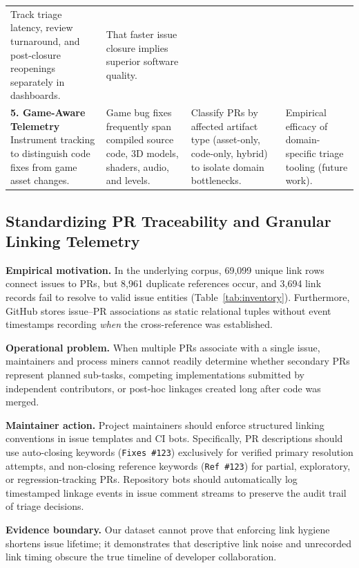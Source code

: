 \begin{table}[htbp]
\begin{tabularx}{\textwidth}{@{}
  >{\raggedright\arraybackslash}p{3.6cm}
  >{\raggedright\arraybackslash}X
  >{\raggedright\arraybackslash}X
  >{\raggedright\arraybackslash}p{3.0cm}@{}}
Track triage latency, review turnaround, and post-closure reopenings separately in dashboards. &
That faster issue closure implies superior software quality. \\
\addlinespace
\textbf{5. Game-Aware Telemetry}\newline
Instrument tracking to distinguish code fixes from game asset changes. &
Game bug fixes frequently span compiled source code, 3D models, shaders, audio, and levels. &
Classify PRs by affected artifact type (asset-only, code-only, hybrid) to isolate domain bottlenecks. &
Empirical efficacy of domain-specific triage tooling (future work). \\
\bottomrule
\end{tabularx}
\end{table}

\subsection{Standardizing PR Traceability and Granular Linking Telemetry}
\textbf{Empirical motivation.} In the underlying corpus, 69,099 unique link rows connect issues to PRs, but 8,961 duplicate references occur, and 3,694 link records fail to resolve to valid issue entities (Table~\ref{tab:inventory}). Furthermore, GitHub stores issue--PR associations as static relational tuples without event timestamps recording \emph{when} the cross-reference was established.

\textbf{Operational problem.} When multiple PRs associate with a single issue, maintainers and process miners cannot readily determine whether secondary PRs represent planned sub-tasks, competing implementations submitted by independent contributors, or post-hoc linkages created long after code was merged.

\textbf{Maintainer action.} Project maintainers should enforce structured linking conventions in issue templates and CI bots. Specifically, PR descriptions should use auto-closing keywords (\texttt{Fixes \#123}) exclusively for verified primary resolution attempts, and non-closing reference keywords (\texttt{Ref \#123}) for partial, exploratory, or regression-tracking PRs. Repository bots should automatically log timestamped linkage events in issue comment streams to preserve the audit trail of triage decisions.

\textbf{Evidence boundary.} Our dataset cannot prove that enforcing link hygiene shortens issue lifetime; it demonstrates that descriptive link noise and unrecorded link timing obscure the true timeline of developer collaboration.


